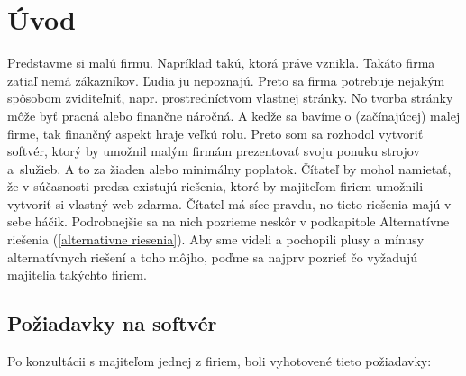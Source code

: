 \chapter*{Úvod}

Predstavme si malú firmu. Napríklad takú, ktorá práve vznikla. Takáto firma zatiaľ nemá zákazníkov. Ľudia ju nepoznajú. Preto sa firma potrebuje nejakým spôsobom zviditeľniť, napr. prostredníctvom vlastnej stránky. No tvorba stránky môže byť pracná alebo finančne náročná. A kedže sa bavíme o (začínajúcej) malej firme, tak finančný aspekt hraje veľkú rolu. Preto som sa rozhodol vytvoriť softvér, ktorý by umožnil malým firmám prezentovať svoju ponuku strojov a~služieb. A to za žiaden alebo minimálny poplatok. Čítateľ by mohol namietať, že v súčasnosti predsa existujú riešenia, ktoré by majiteľom firiem umožnili vytvoriť si vlastný web zdarma. Čítateľ má síce pravdu, no tieto riešenia majú v sebe háčik. Podrobnejšie sa na nich pozrieme neskôr v podkapitole Alternatívne riešenia (\ref{alternativne riesenia}). Aby sme videli a pochopili plusy a mínusy alternatívnych riešení a toho môjho, poďme sa najprv pozrieť čo vyžadujú majitelia takýchto firiem.

\section{Požiadavky na softvér}
\label{poziadavky}

Po konzultácii s majiteľom jednej z firiem, boli vyhotovené tieto požiadavky:

